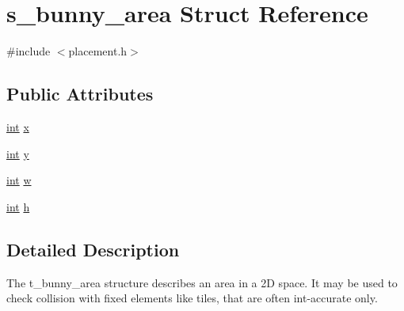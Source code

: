 \hypertarget{structs__bunny__area}{\section{s\-\_\-bunny\-\_\-area Struct Reference}
\label{structs__bunny__area}
}


{\ttfamily \#include $<$placement.\-h$>$}

\subsection*{Public Attributes}
\begin{DoxyCompactItemize}
\item 
\hyperlink{term__entry_8h_ad65b480f8c8270356b45a9890f6499ae}{int} \hyperlink{structs__bunny__area_a25101bc0ca48ec8caed94af508b995a9}{x}
\item 
\hyperlink{term__entry_8h_ad65b480f8c8270356b45a9890f6499ae}{int} \hyperlink{structs__bunny__area_a066f5e2f71ddf36fed5223e528f88756}{y}
\item 
\hyperlink{term__entry_8h_ad65b480f8c8270356b45a9890f6499ae}{int} \hyperlink{structs__bunny__area_a419110d4524d2136e4ad831e3f2dc2c3}{w}
\item 
\hyperlink{term__entry_8h_ad65b480f8c8270356b45a9890f6499ae}{int} \hyperlink{structs__bunny__area_aa0740370ea4c890facdd2e67c43cc4e3}{h}
\end{DoxyCompactItemize}


\subsection{Detailed Description}
The t\-\_\-bunny\-\_\-area structure describes an area in a 2\-D space. It may be used to check collision with fixed elements like tiles, that are often int-\/accurate only. 

